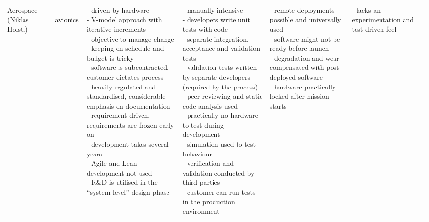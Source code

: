 \documentclass[english]{tktltiki2}
\begin{document}
\begin{landscape}
\begin{longtable}{|p{2.5cm}|p{1.5cm}|p{4cm}|p{4cm}|p{4cm}|p{4cm}|}
        Aerospace (Niklas Holsti) &
        - avionics &
        \parbox[t]{4cm}{- driven by hardware \\
                        - V-model approach with iterative increments \\
                        - objective to manage change \\
                        - keeping on schedule and budget is tricky \\
                        - software is subcontracted, customer dictates process \\
                        - heavily regulated and standardised, considerable emphasis on documentation \\
                        - requirement-driven, requirements are frozen early on \\
                        - development takes several years \\
                        - Agile and Lean development not used \\
                        - R\&D is utilised in the “system level” design phase} &
        \parbox[t]{4cm}{- manually intensive \\
                        - developers write unit tests with code \\
                        - separate integration, acceptance and validation tests \\
                        - validation tests written by separate developers (required by the process) \\
                        - peer reviewing and static code analysis used \\
                        - practically no hardware to test during development \\
                        - simulation used to test behaviour \\
                        - verification and validation conducted by third parties \\
                        - customer can run tests in the production environment} &
        \parbox[t]{4cm}{- remote deployments possible and universally used \\
                        - software might not be ready before launch \\
                        - degradation and wear compensated with post-deployed software \\
                        - hardware practically locked after mission starts} &
        \parbox[t]{4cm}{- lacks an experimentation and test-driven feel \\
}
\end{longtable}
\end{landscape}
\end{document}
